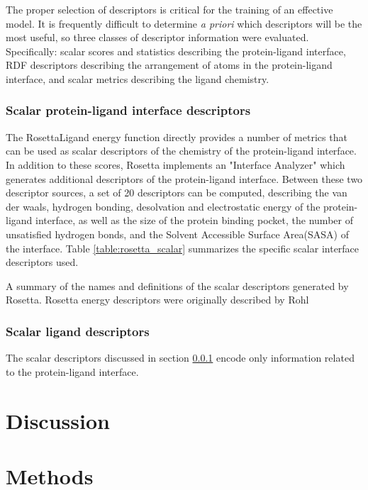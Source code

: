 The proper selection of descriptors is critical for the training of an effective model.
It is frequently difficult to determine \textit{a priori} which descriptors will be the most useful, so three classes of descriptor information were evaluated.  Specifically: scalar scores and statistics describing the protein-ligand interface,  RDF descriptors describing the arrangement of atoms in the protein-ligand interface, and scalar metrics describing the ligand chemistry.

\subsubsection{Scalar protein-ligand interface descriptors}
\label{subsubsec:scalar_rosetta}
The RosettaLigand energy function directly provides a number of metrics that can be used as scalar descriptors of the chemistry of the protein-ligand interface.
In addition to these scores, Rosetta implements an "Interface Analyzer" which generates additional descriptors of the protein-ligand interface.
Between these two descriptor sources, a set of 20 descriptors can be computed, describing the van der waals, hydrogen bonding, desolvation and electrostatic energy of the protein-ligand interface, as well as the size of the protein binding pocket, the number of unsatisfied hydrogen bonds, and the Solvent Accessible Surface Area(SASA) of the interface.
Table \ref{table:rosetta_scalar} summarizes the specific scalar interface descriptors used.
\begin{table}
\scriptsize
\renewcommand{\tabcolsep}{0.09cm}
\centering

\caption{A summary of the names and definitions of the scalar descriptors generated by Rosetta.
Rosetta energy descriptors were originally described by Rohl\citep{Rohl:2004dh} }
\label{table:rosetta_scalar}
\end{table}

\subsubsection{Scalar ligand descriptors}

The scalar descriptors discussed in section \ref{subsubsec:scalar_rosetta} encode only information related to the protein-ligand interface. 

\section{Discussion}



\section{Methods}